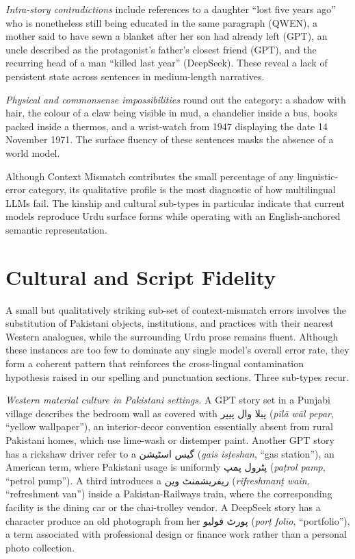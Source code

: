 \documentclass[11pt]{article}
\begin{document}
\textit{Intra-story contradictions} include
references to a daughter ``lost five years ago''
who is nonetheless still being educated in the same
paragraph (QWEN), a mother said to have sewn a
blanket after her son had already left (GPT), an
uncle described as the protagonist's father's
closest friend (GPT), and the recurring head of a
man ``killed last year'' (DeepSeek). These reveal a
lack of persistent state across sentences in
medium-length narratives.

\textit{Physical and commonsense impossibilities}
round out the category: a shadow with hair, the
colour of a claw being visible in mud, a chandelier
inside a bus, books packed inside a thermos, and a
wrist-watch from 1947 displaying the date 14
November 1971. The surface fluency of these
sentences masks the absence of a world model.

Although Context Mismatch contributes the small
percentage of any linguistic-error category, its
qualitative profile is the most diagnostic of how
multilingual LLMs fail. The kinship and cultural sub-types
in particular indicate that current models reproduce
Urdu surface forms while operating with an
English-anchored semantic representation.



\section{Cultural and Script Fidelity}
 \label{sec:cultural}A small but qualitatively striking sub-set of
context-mismatch errors involves the substitution
of Pakistani objects, institutions, and practices
with their nearest Western analogues, while the
surrounding Urdu prose remains fluent. Although
these instances are too few to dominate any single
model's overall error rate, they form a coherent
pattern that reinforces the cross-lingual
contamination hypothesis raised in our spelling
and punctuation sections. Three sub-types recur.

\textit{Western material culture in Pakistani
settings.} A GPT story set in a Punjabi village
describes the bedroom wall as covered with
\foreignlanguage{arabic}{پیلا وال پیپر}
(\textit{pīlā wāl pepar}, ``yellow wallpaper''), an
interior-decor convention essentially absent from
rural Pakistani homes, which use lime-wash or
distemper paint. Another GPT story has a rickshaw
driver refer to a
\foreignlanguage{arabic}{گیس اسٹیشن}
(\textit{gais isṭeshan}, ``gas station''), an
American term, where Pakistani usage is uniformly
\foreignlanguage{arabic}{پٹرول پمپ}
(\textit{paṭrol pamp}, ``petrol pump''). A third
introduces a
\foreignlanguage{arabic}{ریفریشمنٹ وین}
(\textit{rifreshmanṭ wain}, ``refreshment van'')
inside a Pakistan-Railways train, where the
corresponding facility is the dining car or the
chai-trolley vendor. A DeepSeek story has a
character produce an old photograph from her
\foreignlanguage{arabic}{پورٹ فولیو}
(\textit{porṭ folīo}, ``portfolio''), a term
associated with professional design or finance
work rather than a personal photo collection.
\end{document}
